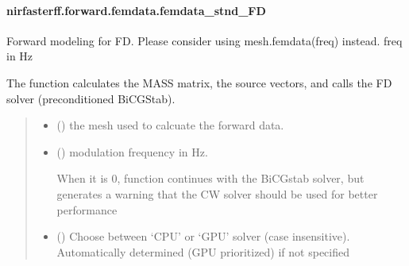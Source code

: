 \documentclass[letterpaper,10pt,english]{sphinxmanual}
\begin{document}
\sphinxstepscope


\paragraph{nirfasterff.forward.femdata.femdata\_stnd\_FD}
\label{\detokenize{_autosummary/nirfasterff.forward.femdata.femdata_stnd_FD:nirfasterff-forward-femdata-femdata-stnd-fd}}\label{\detokenize{_autosummary/nirfasterff.forward.femdata.femdata_stnd_FD::doc}}

\begin{fulllineitems}
\label{\detokenize{_autosummary/nirfasterff.forward.femdata.femdata_stnd_FD:nirfasterff.forward.femdata.femdata_stnd_FD}}
\pysigstartsignatures
\pysiglinewithargsret
{}
{\sphinxparamcomma {}\sphinxparamcomma {}\sphinxparamcomma {}}
{}
\pysigstopsignatures
\sphinxAtStartPar
Forward modeling for FD. Please consider using mesh.femdata(freq) instead. freq in Hz

\sphinxAtStartPar
The function calculates the MASS matrix, the source vectors, and calls the FD solver (preconditioned BiCGStab).
\begin{quote}\begin{description}
\begin{itemize}
\item {} 
\sphinxAtStartPar
{} () \textendash{} the mesh used to calcuate the forward data.

\item {} 
\sphinxAtStartPar
{} () \textendash{} 
\sphinxAtStartPar
modulation frequency in Hz.

\sphinxAtStartPar
When it is 0, function continues with the BiCGstab solver, but generates a warning that the CW solver should be used for better performance


\item {} 
\sphinxAtStartPar
{} (\sphinxstyleliteralemphasis{\sphinxupquote{, }}) \textendash{} Choose between ‘CPU’ or ‘GPU’ solver (case insensitive). Automatically determined (GPU prioritized) if not specified


\end{itemize}
\end{description}
\end{quote}
\end{fulllineitems}
\end{document}

